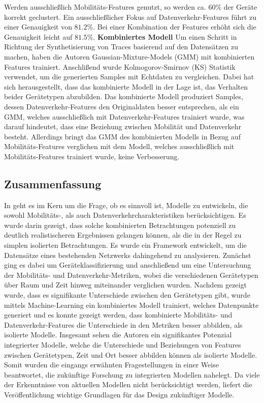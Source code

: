\documentclass[12pt, a4paper]{article}
\begin{document}
Werden ausschließlich Mobilitäts-Features genutzt, so werden ca. $60 \%$ der Geräte korrekt geclustert.
Ein ausschließlicher Fokus auf Datenverkehr-Features führt zu einer Genauigkeit von $81.2 \%$.
Bei einer Kombination der Features erhöht sich die Genauigkeit leicht auf $81.5 \%$.
\newline\newline
\textbf{Kombiniertes Modell}\newline
Um einen Schritt in Richtung der Synthetisierung von Traces basierend auf den Datensätzen zu machen,
haben die Autoren Gaussian-Mixture-Models (GMM) mit kombinierten Features trainiert.
Anschlißend wurde Kolmogorov-Smirnov (KS) Statistik verwendet, um die generierten Samples mit Echtdaten zu vergleichen.
Dabei hat sich herausgestellt, dass das kombinierte Modell in der Lage ist, das Verhalten beider Gerätetypen abzubilden.
Das kombinierte Modell produziert Samples, dessen Datenverkehr-Features den Originaldaten besser entsprechen, als ein GMM,
welches ausschließlich mit Datenverkehr-Features trainiert wurde, was darauf hindeutet, dass eine Beziehung zwischen Mobilität
und Datenverkehr besteht. Allerdings bringt das GMM des kombinierten Modells in Bezug auf Mobilitäts-Features verglichen mit
dem Modell, welches ausschließlich mit Mobilitäts-Features trainiert wurde, keine Verbesserung.

\subsection{Zusammenfassung}
\label{sec:summary}

In \cite{Alipour2018} geht es im Kern um die Frage, ob es sinnvoll ist, Modelle zu entwickeln, die sowohl
Mobilitäts-, als auch Datenverkehrcharakteristiken berücksichtigen. Es wurde darin gezeigt, dass solche
kombinierten Betrachtungen potenziell zu deutlich realistischeren Ergebnissen gelangen können,
als die in der Regel zu simplen isolierten Betrachtungen.
Es wurde ein Framework entwickelt, um die Datensätze eines bestehenden Netzwerks dahingehend zu analysieren.
Zunächst ging es dabei um Geräteklassifizierung und anschließend um eine Untersuchung der Mobilitäts-
und Datenverkehr-Metriken, wobei die verschiedenen Gerätetypen über Raum und Zeit hinweg miteinander verglichen wurden.
Nachdem gezeigt wurde, dass es signifikante Unterschiede zwischen den Gerätetypen gibt,
wurde mittels Machine-Learning ein kombiniertes Modell trainiert, welches Datenpunkte generiert
und es konnte gezeigt werden, dass kombinierte Mobilitäts- und Datenverkehr-Features die Unterschiede in den
Metriken besser abbilden, als isolierte Modelle. Insgesamt sehen die Autoren ein signifikantes Potenzial integrierter 
Modelle, welche die Unterschiede und Beziehungen von Features zwischen Gerätetypen, Zeit und
Ort besser abbilden können als isolierte Modelle. Somit wurden die eingangs erwähnten Fragestellungen in einer Weise
beantwortet, die zukünftige Forschung zu integrierten Modellen nahelegt. Da viele der Erkenntnisse von aktuellen 
Modellen nicht berücksichtigt werden, liefert die Veröffentlichung wichtige Grundlagen für das Design zukünftiger Modelle.
\end{document}

